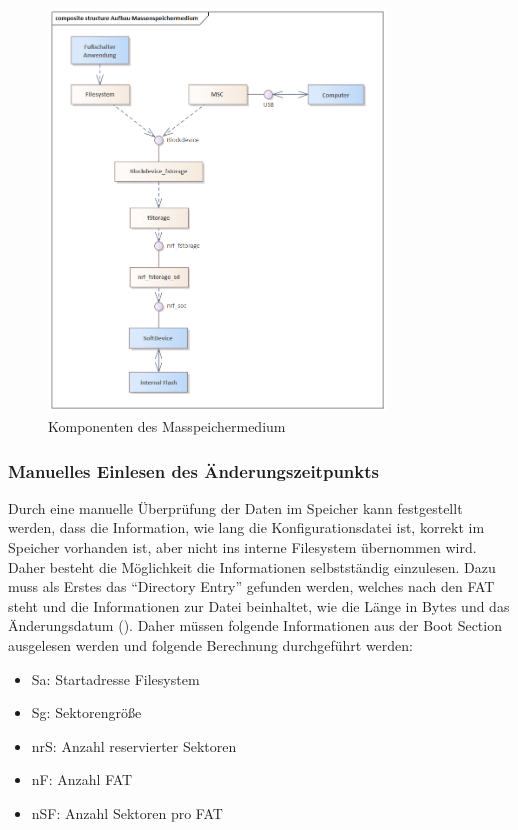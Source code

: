 \begin{figure}[H] 
	\centering
	\includegraphics[width=0.8\textwidth]{figures/Aufbau_Massenspeichermedium.png}
	\caption{Komponenten des Masspeichermedium}
	\label{fig:KomponentenMasspeichermedium}
\end{figure}

\subsubsection{Manuelles Einlesen des Änderungszeitpunkts}
Durch eine manuelle Überprüfung der Daten im Speicher kann festgestellt werden, dass die Information, wie lang die Konfigurationsdatei ist, korrekt im Speicher vorhanden ist, aber nicht ins interne Filesystem übernommen wird. Daher besteht die Möglichkeit die Informationen selbstständig einzulesen. Dazu muss als Erstes das ``Directory Entry'' gefunden werden, welches nach den \ac{FAT} steht und die Informationen zur Datei beinhaltet, wie die Länge in Bytes und das Änderungsdatum (\cite[Abschnitt 1.4]{FAT}). Daher müssen folgende Informationen aus der Boot Section ausgelesen werden und folgende Berechnung durchgeführt werden:
\begin{itemize}
    \item Sa: Startadresse Filesystem
    \item Sg: Sektorengröße
    \item nrS: Anzahl reservierter Sektoren
    \item nF: Anzahl \ac{FAT}
    \item nSF: Anzahl Sektoren pro \ac{FAT}
\end{itemize}

